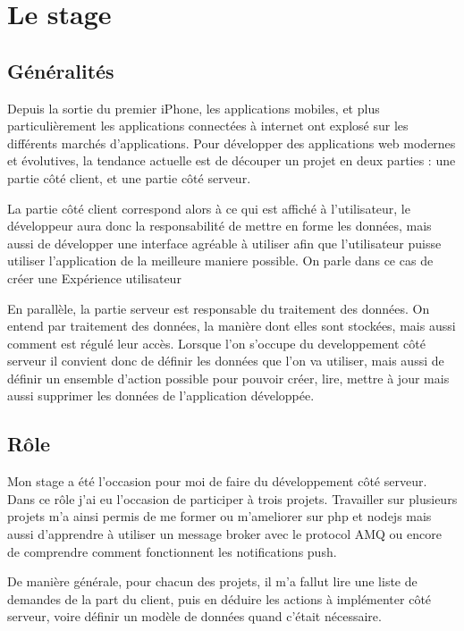 \documentclass[rapport.tex]{subfiles}
\begin{document}
    \chapter{Le stage}
    \section{Généralités}
    Depuis la sortie du premier iPhone, les applications mobiles, et plus particulièrement
    les applications connectées à internet ont explosé sur les différents marchés d'applications.
    Pour développer des applications web modernes et évolutives, 
    la tendance actuelle est de découper un projet en deux parties : une
    partie côté client, et une partie côté serveur.

    La partie côté client correspond
    alors à ce qui est affiché à l'utilisateur, le développeur aura donc la responsabilité
    de mettre en forme les données, mais aussi de développer une interface agréable à utiliser
    afin que l'utilisateur puisse utiliser l'application de la meilleure maniere possible.
    On parle dans ce cas de créer une \og Expérience utilisateur\fg~

    En parallèle, la partie serveur est responsable du traitement des données. On entend par traitement
    des données, la manière dont elles sont stockées, mais aussi comment est régulé leur accès.
    Lorsque l'on s'occupe du developpement côté serveur il convient donc de définir les données que l'on
    va utiliser, mais aussi de définir un ensemble d'action possible pour pouvoir créer, lire, mettre à jour
    mais aussi supprimer les données de l'application développée.

    \section{Rôle}
     Mon stage a été l'occasion pour moi de faire du développement côté serveur. Dans ce rôle j'ai eu l'occasion de
     participer à trois projets. Travailler sur plusieurs projets m'a ainsi permis de me former ou m'ameliorer sur php et nodejs
     mais aussi d'apprendre à utiliser un message broker avec le protocol AMQ ou encore de comprendre comment fonctionnent les notifications
     push.

    De manière générale, pour chacun des projets, il m'a fallut lire une liste de demandes de la part du client, puis en déduire les actions
    à implémenter côté serveur, voire définir un modèle de données quand c'était nécessaire. 

    
\end{document}
